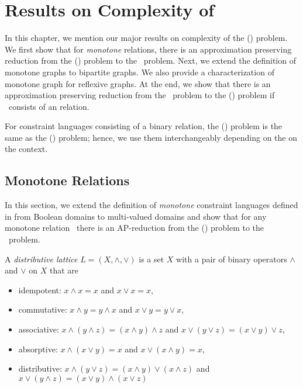 \chapter{Results on Complexity of \cbis} \label{chp:results}
In this chapter, we mention our major results on complexity 
of the \ccsp(\mrelset) problem. We first show that for \emph{monotone} relations, there is an
approximation preserving reduction from the \ccsp(\mrelset) problem to the \cbis\ problem.
Next, we extend the definition of monotone graphs to bipartite graphs. We also provide a characterization of monotone graph for reflexive graphs.
At the end, we show that there is an approximation preserving reduction from the \cbis\ problem 
to the \ccsp(\mrelset) problem if \mrelset\ consists of an \emph{\RBA} relation.

For constraint languages consisting of a binary relation, the \ccsp(\mrelset) problem is
the same as the \chom(\mH) problem; hence, we use them interchangeably depending on the on the context.

\section{Monotone Relations}
In this section, we extend the definition of \emph{monotone} constraint languages defined in
\cite{Trichotomy} from Boolean domains to multi-valued domains and show that for
any monotone relation \mrelset\ there is an AP-reduction from the \ccsp(\mrelset) problem to
the \cbis\ problem.

\begin{defi} 
A \emph{distributive lattice} \(L=(X,\wedge,\vee)\) is a set \(X\) with a pair of binary operators \(\wedge\)
and \(\vee\) on \(X\) that are 
\begin{itemize}
\item idempotent: \(x \wedge x = x\) and \(x \vee x = x\),
\item commutative: \(x \wedge y = y \wedge x\) and \(x \vee y = y \vee x\),
\item associative: \(x \wedge (y \wedge z) = (x \wedge y) \wedge z\) and 
\(x \vee (y \vee z) = (x \vee y) \vee z\),
\item absorptive: \(x \wedge (x\vee y) = x\) and \(x \vee (x \wedge y) = x\),
\item distributive: \(x \wedge (y \vee z) = (x \wedge y) \vee (x \wedge z)\) and
\(x \vee (y \wedge z) = (x \vee y) \wedge (x \vee z)\)
\end{itemize}
\end{defi}

